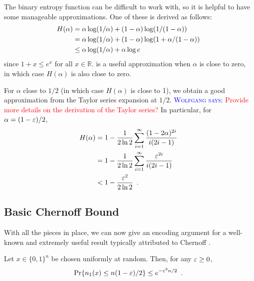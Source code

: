 \documentclass{patmorin}
\newcommand{\aremark}[3]{\textcolor{blue}{\textsc{#1 #2:}}
  \textcolor{red}{\textsf{#3}}}
\newcommand{\wolfgang}[2][says]{\aremark{Wolfgang}{#1}{#2}}
\begin{document}
The binary entropy function can be difficult to work with, so it is
helpful to have some manageable approximations.  One of these is
derived as follows:
\begin{align}
  H(\alpha) & = \alpha\log(1/\alpha) + (1-\alpha)\log(1/(1-\alpha)) \notag \\
            & = \alpha\log(1/\alpha) + (1-\alpha)\log(1+\alpha/(1-\alpha)) \notag \\
            & \le \alpha\log(1/\alpha) + \alpha\log e \eqlabel{entropy-i} 
\end{align}
since $1+x\le e^x$ for all $x\in\mathbb{R}$.  is a
useful approximation when $\alpha$ is close to zero, in which case 
$H(\alpha)$ is also close to zero.

For $\alpha$ close to $1/2$ (in which case $H(\alpha)$ is close to 1),
we obtain a good approximation from the Taylor series expansion at
$1/2$.  \wolfgang{Provide more details on the derivation of the Taylor
  series?}  In particular, for $\alpha=(1-\varepsilon)/2$,
\begin{align}
  H(\alpha) & = 1-\frac{1}{2\ln 2}\sum_{i=1}^{\infty}\frac{(1-2\alpha)^{2i}}{i(2i-1)} 
              \notag \\ 
            & = 1-\frac{1}{2\ln 2}\sum_{i=1}^{\infty}\frac{\eps^{2i}}{i(2i-1)} 
              \notag \\ 
            & < 1-\frac{\eps^2}{2\ln 2} \enspace .\eqlabel{entropy-ii}
\end{align}

\subsection{Basic Chernoff Bound}

With all the pieces in place, we can now give an encoding argument for
a well-known and extremely useful result typically attributed to
Chernoff \cite{chernoff:bound}.

\begin{thm}
  Let $x\in\{0,1\}^n$ be chosen uniformly at random. Then, for any
  $\varepsilon \geq 0$,
  \[
    \Pr\{n_1(x) \le n(1-\varepsilon)/2\} \le e^{-\varepsilon^2n/2} \enspace .
  \]
\end{thm}
\end{document}
